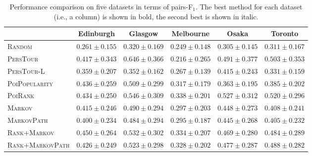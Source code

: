 \begin{table*}[t]
\caption{Performance comparison on five datasets in terms of pairs-F$_1$.
        The best method for each dataset (i.e., a column) is shown in bold, the second best is shown in italic.}
\label{tab:pairf1}
\centering
\setlength{\tabcolsep}{10pt} %
\begin{tabular}{l|ccccc} \hline
 & Edinburgh & Glasgow & Melbourne & Osaka & Toronto \\ \hline
\textsc{Random} & $0.261\pm0.155$ & $0.320\pm0.169$ & $0.249\pm0.148$ & $0.305\pm0.145$ & $0.311\pm0.167$ \\
\textsc{PersTour}\cite{ijcai15} & $0.417\pm0.343$ & $\mathbf{0.646\pm0.366}$ & $0.216\pm0.265$ & $\mathit{0.491\pm0.377}$ & $\mathit{0.503\pm0.353}$ \\
\textsc{PersTour-L} & $0.359\pm0.207$ & $0.352\pm0.162$ & $0.267\pm0.139$ & $0.415\pm0.243$ & $0.331\pm0.159$ \\
\textsc{PoiPopularity} & $\mathit{0.436\pm0.259}$ & $0.509\pm0.299$ & $0.317\pm0.179$ & $0.363\pm0.195$ & $0.385\pm0.202$ \\
\textsc{PoiRank} & $0.434\pm0.250$ & $\mathit{0.546\pm0.309}$ & $\mathbf{0.338\pm0.201}$ & $\mathbf{0.527\pm0.312}$ & $\mathbf{0.520\pm0.296}$ \\
\textsc{Markov} & $0.415\pm0.246$ & $0.490\pm0.294$ & $0.297\pm0.203$ & $0.448\pm0.273$ & $0.408\pm0.241$ \\
\textsc{MarkovPath} & $0.400\pm0.234$ & $0.484\pm0.294$ & $0.295\pm0.187$ & $0.445\pm0.268$ & $0.405\pm0.232$ \\
\textsc{Rank+Markov} & $\mathbf{0.450\pm0.264}$ & $0.532\pm0.302$ & $\mathit{0.334\pm0.207}$ & $0.469\pm0.280$ & $0.484\pm0.289$ \\
\textsc{Rank+MarkovPath} & $0.426\pm0.249$ & $0.523\pm0.298$ & $0.328\pm0.202$ & $0.477\pm0.287$ & $0.488\pm0.282$ \\
\hline
\end{tabular}
\end{table*}
